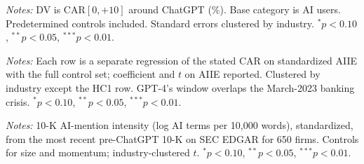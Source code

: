 \documentclass[12pt]{article}
\newcommand{\edgarnfirms}{650}\newcommand{\edgarcorr}{0.00}\newcommand{\edgarshare}{0}}
\begin{document}
\begin{table}[htbp]\centering
\begin{threeparttable}
\caption{The sign channel: bucket-dummy regression (ChatGPT $[0,+10]$)}\label{tab:sign}\small

\begin{tablenotes}\small\item \textit{Notes:} DV is CAR$[0,+10]$ around ChatGPT (\%). Base
category is AI users. Predetermined controls included. Standard errors clustered by industry.
$^{*}p<0.10$, $^{**}p<0.05$, $^{***}p<0.01$.
\end{tablenotes}
\end{threeparttable}
\end{table}

\begin{table}[htbp]\centering
\begin{threeparttable}
\caption{Robustness: the AIIE coefficient across windows, events, and estimators}\label{tab:robust}\small

\begin{tablenotes}\small\item \textit{Notes:} Each row is a separate regression of the stated
CAR on standardized AIIE with the full control set; coefficient and $t$ on AIIE reported.
Clustered by industry except the HC1 row. GPT-4's window overlaps the March-2023 banking
crisis. $^{*}p<0.10$, $^{**}p<0.05$, $^{***}p<0.01$.
\end{tablenotes}
\end{threeparttable}
\end{table}

\begin{table}[htbp]\centering
\begin{threeparttable}
\caption{Firm-level validation: 10-K AI-mention intensity}\label{tab:edgar}\small

\begin{tablenotes}\small\item \textit{Notes:} 10-K AI-mention intensity (log AI terms per
10{,}000 words), standardized, from the most recent pre-ChatGPT 10-K on SEC EDGAR for
\edgarnfirms{} firms. Controls for size and momentum; industry-clustered $t$.
$^{*}p<0.10$, $^{**}p<0.05$, $^{***}p<0.01$.
\end{tablenotes}
\end{threeparttable}
\end{table}
\end{document}
